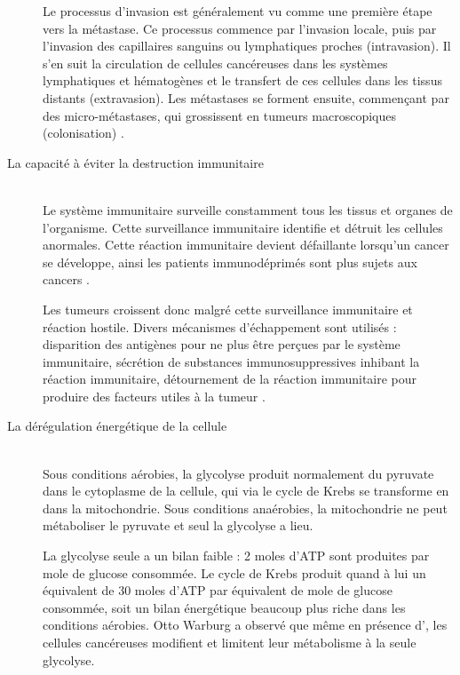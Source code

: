 \begin{description}
          Le processus d'invasion est généralement vu comme une première étape vers la métastase.
          Ce processus commence par l'invasion locale, puis par l'invasion des capillaires sanguins ou lymphatiques proches (intravasion).
          Il s'en suit la circulation de cellules cancéreuses dans les systèmes lymphatiques et hématogènes et le transfert de ces cellules dans les tissus distants (extravasion).
          Les métastases se forment ensuite, commençant par des micro-métastases, qui grossissent en tumeurs macroscopiques (colonisation) \citep{Talmadge2010}.

        \item [La capacité à éviter la destruction immunitaire]         \hfill \\
          Le système immunitaire surveille constamment tous les tissus et organes de l'organisme.
          Cette surveillance immunitaire identifie et détruit les cellules anormales.
          Cette réaction immunitaire devient défaillante lorsqu'un cancer se développe, ainsi les patients immunodéprimés sont plus sujets aux cancers \citep{Vajdic2010}.

          Les tumeurs croissent donc malgré cette surveillance immunitaire et réaction hostile.
          Divers mécanismes d'échappement sont utilisés : disparition des antigènes pour ne plus être perçues par le système immunitaire, sécrétion de substances immunosuppressives inhibant la réaction immunitaire, détournement de la réaction immunitaire pour produire des facteurs utiles à la tumeur \citep{Manjili2012}.

        \item [La dérégulation énergétique de la cellule]               \hfill \\
          Sous conditions aérobies, la glycolyse produit normalement du pyruvate dans le cytoplasme de la cellule, qui via le cycle de Krebs se transforme en {\COO} dans la mitochondrie.
          Sous conditions anaérobies, la mitochondrie ne peut métaboliser le pyruvate et seul la glycolyse a lieu.

          La glycolyse seule a un bilan faible : 2 moles d'\acs{ATP} sont produites par mole de glucose consommée.
          Le cycle de Krebs produit quand à lui un équivalent de 30 moles d'\acs{ATP} par équivalent de mole de glucose consommée, soit un bilan énergétique beaucoup plus riche dans les conditions aérobies.
          Otto Warburg a observé que même en présence d'{\OO}, les cellules cancéreuses modifient et limitent leur métabolisme à la seule glycolyse.


\end{description}
